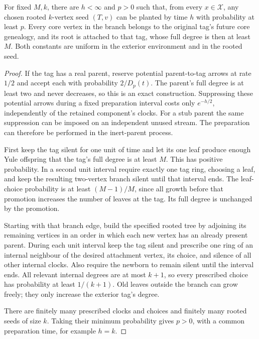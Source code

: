 \begin{lemma}\label{gs:uniform-preparation}
For fixed $M,k$, there are $h<\infty$ and $p>0$ such that, from every
$x\in\mathcal X$, any chosen rooted $k$-vertex seed $(T,v)$ can be
planted by time $h$ with probability at least $p$. Every core vertex in
the branch belongs to the original tag's future core genealogy, and its
root is attached to that tag, whose full degree is then at least $M$.
Both constants are uniform
in the exterior environment and in the rooted seed.
\end{lemma}

\begin{proof}
If the tag has a real parent, reserve potential parent-to-tag arrows
at rate $1/2$ and accept each with probability $2/D_p(t)$. The parent's
full degree is at least two and never decreases, so this is an exact
construction. Suppressing these potential arrows during a fixed
preparation interval costs only $e^{-h/2}$, independently of the
retained component's clocks. For a stub parent the same suppression
can be imposed on an independent unused stream. The preparation can
therefore be performed in the inert-parent process.

First keep the tag silent for one unit of time and let its one leaf
produce enough Yule offspring that the tag's full degree is at least
$M$. This has positive probability. In a second unit interval require
exactly one tag ring, choosing a leaf, and keep the resulting two-vertex
branch silent until that interval ends. The leaf-choice probability is
at least $(M-1)/M$, since all growth before that promotion increases
the number of leaves at the tag. Its full degree is unchanged by the
promotion.

Starting with that branch edge, build the specified rooted tree by
adjoining its remaining vertices in an order in which each new vertex
has an already present parent. During each unit interval keep the tag
silent and prescribe one ring of an internal neighbour of the desired
attachment vertex, its choice, and silence of all other internal clocks.
Also require the newborn to remain silent until the interval ends.
All relevant internal degrees are at most $k+1$, so every prescribed
choice has probability at least $1/(k+1)$. Old leaves outside the branch
can grow freely; they only increase the exterior tag's degree.

There are finitely many prescribed clocks and choices and finitely many
rooted seeds of size $k$. Taking their minimum probability gives
$p>0$, with a common preparation time, for example $h=k$.
\end{proof}

